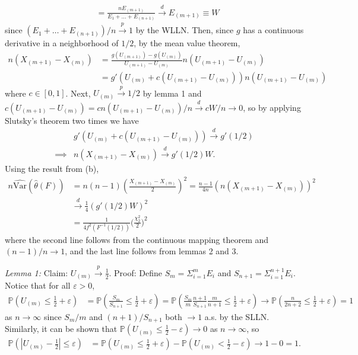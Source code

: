 \documentclass[12pt]{article}
\newcommand{\p}{\mathbb{P}}
\newcommand{\V}{\text{Var}}
\newcommand{\h}[1]{\hat{#1}}
\begin{document}
\begin{enumerate}
\begin{enumerate}
\begin{align*}
            &= \frac{nE_{(m+1)}}{E_1+\ldots+E_{(n+1)}} \overset{d}{\to} E_{(m+1)} \equiv W
        \end{align*} since $(E_1+\ldots+E_{(n+1)})/n \overset{p}{\to} 1$ by the WLLN. Then, since $g$ has a continuous derivative in a neighborhood of $1/2$, by the mean value theorem, \begin{align*}
            n(X_{(m+1)}-X_{(m)}) &= \frac{g(U_{(m+1)})-g(U_{(m)})}{U_{(m+1)}-U_{(m)}}n(U_{(m+1)}-U_{(m)})\\
            &= g'(U_{(m)}+c(U_{(m+1)}-U_{(m)}))n(U_{(m+1)}-U_{(m)})
        \end{align*} where $c\in[0,1]$. Next, $U_{(m)} \overset{p}{\to} 1/2$ by lemma 1 and $c(U_{(m+1)}-U_{(m)}) = cn(U_{(m+1)}-U_{(m)})/n \overset{d}{\to} cW/n \to 0$, so by applying Slutsky's theorem two times we have \begin{align*}
            &g'(U_{(m)}+c(U_{(m+1)}-U_{(m)})) \overset{d}{\to} g'(1/2)\\
            \implies &n(X_{(m+1)}-X_{(m)}) \overset{d}{\to} g'(1/2)W.
        \end{align*} Using the result from (b), \begin{align*}
            n\widehat{\V}(\h\theta(F)) &= n(n-1)(\frac{X_{(m+1)}-X_{(m)}}{2})^2 = \frac{n-1}{4n}(n(X_{(m+1)}-X_{(m)}))^2\\
            &\overset{d}{\to} \frac{1}{4}(g'(1/2)W)^2\\
            &= \frac{1}{4f^2(F^{-1}(1/2))}\Big(\frac{\chi^2_2}{2}\Big)^2
        \end{align*} where the second line follows from the continuous mapping theorem and $(n-1)/n \to 1$, and the last line follows from lemmas 2 and 3.

        \textit{Lemma 1:} Claim: $U_{(m)} \overset{p}{\to} \frac{1}{2}$. Proof: Define $S_m = \Sigma_{i=1}^m E_i$ and $S_{n+1} = \Sigma_{i=1}^{n+1} E_i$. Notice that for all $\varepsilon > 0$, \begin{align*}
            \p(U_{(m)}\leq\frac{1}{2}+\varepsilon) &= \p(\frac{S_m}{S_{n+1}}\leq\frac{1}{2}+\varepsilon) = \p(\frac{S_m}{m}\frac{n+1}{S_{n+1}}\frac{m}{n+1}\leq\frac{1}{2}+\varepsilon) \to \p(\frac{n}{2n+2}\leq\frac{1}{2}+\varepsilon) = 1
        \end{align*} as $n \to \infty$ since $S_m/m$ and $(n+1)/S_{n+1}$ both $\to 1$ a.s. by the SLLN. Similarly, it can be shown that $\p(U_{(m)}\leq\frac{1}{2}-\varepsilon) \to 0$ as $n \to \infty$, so \begin{align*}
            \p(|U_{(m)}-\frac{1}{2}|\leq\varepsilon) &= \p(U_{(m)}\leq\frac{1}{2}+\varepsilon) - \p(U_{(m)}<\frac{1}{2}-\varepsilon) \to 1 - 0 = 1.
        \end{align*}


\end{enumerate}
\end{enumerate}
\end{document}
